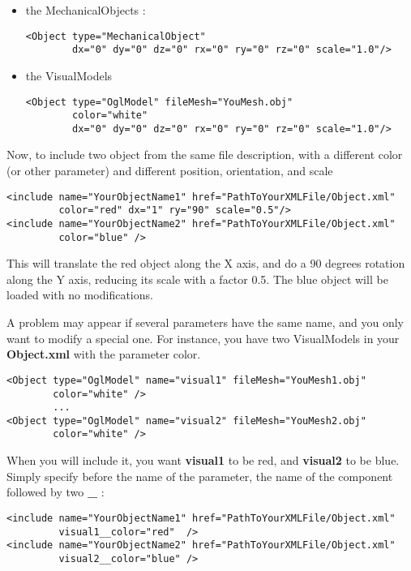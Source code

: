  \begin{itemize}
   \item the MechanicalObjects :
\begin{verbatim}
<Object type="MechanicalObject" 
        dx="0" dy="0" dz="0" rx="0" ry="0" rz="0" scale="1.0"/>
\end{verbatim}
   \item  the VisualModels
   
\begin{verbatim}
<Object type="OglModel" fileMesh="YouMesh.obj" 
        color="white" 
        dx="0" dy="0" dz="0" rx="0" ry="0" rz="0" scale="1.0"/>
\end{verbatim}

 \end{itemize}

Now, to include two object from the same file description, with a different color (or other parameter) and different position, orientation, and scale
\begin{verbatim}
<include name="YourObjectName1" href="PathToYourXMLFile/Object.xml" 
         color="red" dx="1" ry="90" scale="0.5"/>  
<include name="YourObjectName2" href="PathToYourXMLFile/Object.xml" 
         color="blue" />  
\end{verbatim}
This will translate the red object along the X axis, and do a 90 degrees rotation along the Y axis, reducing its scale with a factor 0.5.
The blue object will be loaded with no modifications.
\par
A problem may appear if several parameters have the same name, and you only want to modify a special one. For instance, you have two VisualModels in your { \bf Object.xml} with the parameter color. 

\begin{verbatim}
<Object type="OglModel" name="visual1" fileMesh="YouMesh1.obj" 
        color="white" />
        ...
<Object type="OglModel" name="visual2" fileMesh="YouMesh2.obj" 
        color="white" />
\end{verbatim}
When you will include it, you want { \bf visual1} to be red, and { \bf visual2} to be blue. Simply specify before the name of the parameter, the name of the component followed by two { \bf \_ }:
\begin{verbatim}
<include name="YourObjectName1" href="PathToYourXMLFile/Object.xml" 
         visual1__color="red"  />  
<include name="YourObjectName2" href="PathToYourXMLFile/Object.xml" 
         visual2__color="blue" />  
\end{verbatim}

